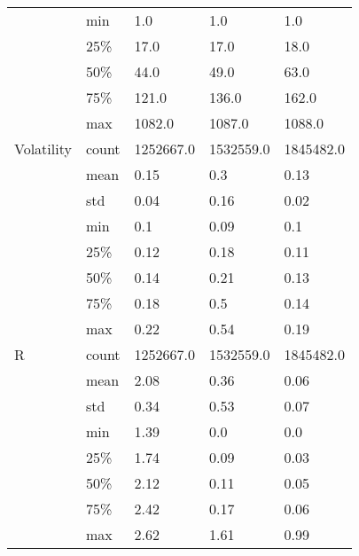 \begin{tabular}{lllll}
  & min &        1.0 &        1.0 &        1.0 \\
  & 25\% &       17.0 &       17.0 &       18.0 \\
  & 50\% &       44.0 &       49.0 &       63.0 \\
  & 75\% &      121.0 &      136.0 &      162.0 \\
  & max &     1082.0 &     1087.0 &     1088.0 \\
Volatility & count &  1252667.0 &  1532559.0 &  1845482.0 \\
  & mean &       0.15 &        0.3 &       0.13 \\
  & std &       0.04 &       0.16 &       0.02 \\
  & min &        0.1 &       0.09 &        0.1 \\
  & 25\% &       0.12 &       0.18 &       0.11 \\
  & 50\% &       0.14 &       0.21 &       0.13 \\
  & 75\% &       0.18 &        0.5 &       0.14 \\
  & max &       0.22 &       0.54 &       0.19 \\
R & count &  1252667.0 &  1532559.0 &  1845482.0 \\
  & mean &       2.08 &       0.36 &       0.06 \\
  & std &       0.34 &       0.53 &       0.07 \\
  & min &       1.39 &        0.0 &        0.0 \\
  & 25\% &       1.74 &       0.09 &       0.03 \\
  & 50\% &       2.12 &       0.11 &       0.05 \\
  & 75\% &       2.42 &       0.17 &       0.06 \\
  & max &       2.62 &       1.61 &       0.99 \\
\bottomrule
\end{tabular}

